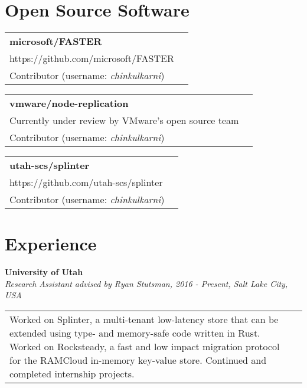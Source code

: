 \documentclass[margin,line]{res}
\begin{document}
\begin{resume}


\section{\sc Open Source Software}
\begin{tabular}{@{}p{5.5in}p{4in}}
{\bf microsoft/FASTER}\\
{\small https://github.com/microsoft/FASTER}\\
{\small Contributor (username: \emph{chinkulkarni})} \\
\end{tabular}

\vspace{-2.5pt}
\begin{tabular}{@{}p{5.5in}p{4in}}
{\bf vmware/node-replication}\\
{\small Currently under review by VMware's open source team}\\
{\small Contributor (username: \emph{chinkulkarni})} \\
\end{tabular}

\vspace{-2.5pt}
\begin{tabular}{@{}p{5.5in}p{4in}}
{\bf utah-scs/splinter}\\
{\small https://github.com/utah-scs/splinter}\\
{\small Contributor (username: \emph{chinkulkarni})} \\
\end{tabular}

\section{\sc Experience}
{\bf University of Utah}\\
{\small\em Research Assistant advised by Ryan Stutsman, 2016 - Present,
Salt Lake City, USA}\\
\begin{tabular}{@{}p{5.5in}p{4in}}
{\small Worked on Splinter, a multi-tenant low-latency store that can
be extended using type- and memory-safe code written in Rust. Worked on
Rocksteady, a fast and
low impact migration protocol for the RAMCloud in-memory
key-value store. Continued and completed internship projects.}
\end{tabular}


\end{resume}
\end{document}
